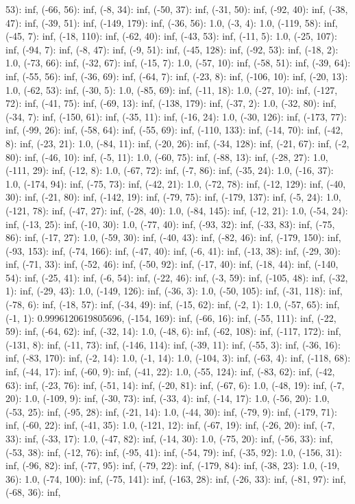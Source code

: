 \documentclass[parskip=half]{scrartcl}
\begin{document}
53): inf, (-66, 56): inf, (-8, 34): inf, (-50, 37): inf, (-31, 50): inf, (-92, 40): inf, (-38, 47): inf, (-39, 51): inf, (-149, 179): inf, (-36, 56): 1.0, (-3, 4): 1.0, (-119, 58): inf, (-45, 7): inf, (-18, 110): inf, (-62, 40): inf, (-43, 53): inf, (-11, 5): 1.0, (-25, 107): inf, (-94, 7): inf, (-8, 47): inf, (-9, 51): inf, (-45, 128): inf, (-92, 53): inf, (-18, 2): 1.0, (-73, 66): inf, (-32, 67): inf, (-15, 7): 1.0, (-57, 10): inf, (-58, 51): inf, (-39, 64): inf, (-55, 56): inf, (-36, 69): inf, (-64, 7): inf, (-23, 8): inf, (-106, 10): inf, (-20, 13): 1.0, (-62, 53): inf, (-30, 5): 1.0, (-85, 69): inf, (-11, 18): 1.0, (-27, 10): inf, (-127, 72): inf, (-41, 75): inf, (-69, 13): inf, (-138, 179): inf, (-37, 2): 1.0, (-32, 80): inf, (-34, 7): inf, (-150, 61): inf, (-35, 11): inf, (-16, 24): 1.0, (-30, 126): inf, (-173, 77): inf, (-99, 26): inf, (-58, 64): inf, (-55, 69): inf, (-110, 133): inf, (-14, 70): inf, (-42, 8): inf, (-23, 21): 1.0, (-84, 11): inf, (-20, 26): inf, (-34, 128): inf, (-21, 67): inf, (-2, 80): inf, (-46, 10): inf, (-5, 11): 1.0, (-60, 75): inf, (-88, 13): inf, (-28, 27): 1.0, (-111, 29): inf, (-12, 8): 1.0, (-67, 72): inf, (-7, 86): inf, (-35, 24): 1.0, (-16, 37): 1.0, (-174, 94): inf, (-75, 73): inf, (-42, 21): 1.0, (-72, 78): inf, (-12, 129): inf, (-40, 30): inf, (-21, 80): inf, (-142, 19): inf, (-79, 75): inf, (-179, 137): inf, (-5, 24): 1.0, (-121, 78): inf, (-47, 27): inf, (-28, 40): 1.0, (-84, 145): inf, (-12, 21): 1.0, (-54, 24): inf, (-13, 25): inf, (-10, 30): 1.0, (-77, 40): inf, (-93, 32): inf, (-33, 83): inf, (-75, 86): inf, (-17, 27): 1.0, (-59, 30): inf, (-40, 43): inf, (-82, 46): inf, (-179, 150): inf, (-93, 153): inf, (-74, 166): inf, (-47, 40): inf, (-6, 41): inf, (-13, 38): inf, (-29, 30): inf, (-71, 33): inf, (-52, 46): inf, (-50, 92): inf, (-17, 40): inf, (-18, 44): inf, (-140, 54): inf, (-25, 41): inf, (-6, 54): inf, (-22, 46): inf, (-3, 59): inf, (-105, 48): inf, (-32, 1): inf, (-29, 43): 1.0, (-149, 126): inf, (-36, 3): 1.0, (-50, 105): inf, (-31, 118): inf, (-78, 6): inf, (-18, 57): inf, (-34, 49): inf, (-15, 62): inf, (-2, 1): 1.0, (-57, 65): inf, (-1, 1): 0.9996120619805696, (-154, 169): inf, (-66, 16): inf, (-55, 111): inf, (-22, 59): inf, (-64, 62): inf, (-32, 14): 1.0, (-48, 6): inf, (-62, 108): inf, (-117, 172): inf, (-131, 8): inf, (-11, 73): inf, (-146, 114): inf, (-39, 11): inf, (-55, 3): inf, (-36, 16): inf, (-83, 170): inf, (-2, 14): 1.0, (-1, 14): 1.0, (-104, 3): inf, (-63, 4): inf, (-118, 68): inf, (-44, 17): inf, (-60, 9): inf, (-41, 22): 1.0, (-55, 124): inf, (-83, 62): inf, (-42, 63): inf, (-23, 76): inf, (-51, 14): inf, (-20, 81): inf, (-67, 6): 1.0, (-48, 19): inf, (-7, 20): 1.0, (-109, 9): inf, (-30, 73): inf, (-33, 4): inf, (-14, 17): 1.0, (-56, 20): 1.0, (-53, 25): inf, (-95, 28): inf, (-21, 14): 1.0, (-44, 30): inf, (-79, 9): inf, (-179, 71): inf, (-60, 22): inf, (-41, 35): 1.0, (-121, 12): inf, (-67, 19): inf, (-26, 20): inf, (-7, 33): inf, (-33, 17): 1.0, (-47, 82): inf, (-14, 30): 1.0, (-75, 20): inf, (-56, 33): inf, (-53, 38): inf, (-12, 76): inf, (-95, 41): inf, (-54, 79): inf, (-35, 92): 1.0, (-156, 31): inf, (-96, 82): inf, (-77, 95): inf, (-79, 22): inf, (-179, 84): inf, (-38, 23): 1.0, (-19, 36): 1.0, (-74, 100): inf, (-75, 141): inf, (-163, 28): inf, (-26, 33): inf, (-81, 97): inf, (-68, 36): inf, 
\end{document}
